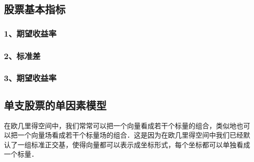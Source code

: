 
\subsection{股票基本指标}
\subsubsection{1、期望收益率}

\subsubsection{2、标准差}
\subsubsection{3、期望收益率}

\subsection{单支股票的单因素模型}
在欧几里得空间中，我们常常可以把一个向量看成若干个标量的组合，类似地也可以把一个向量场看成若干个标量场的组合．这是因为在欧几里得空间中我们已经默认了一组标准正交基，使得向量都可以表示成坐标形式，每个坐标都可以单独看成一个标量．